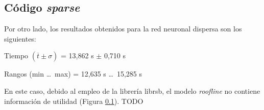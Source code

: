 \subsection{Código \textit{sparse}}
Por otro lado, los resultados obtenidos para la red neuronal dispersa son los siguientes:

\begin{center}
Tiempo $(\overline{t} \pm \sigma)$ = 13,862 s $\pm$ 0,710 s

Rangos (min \ldots\ max) = 12,635 s \ldots\ 15,285 s
\end{center}

En este caso, debido al empleo de la librería librsb, el modelo \textit{roofline} no contiene información de utilidad (Figura \ref{}). TODO